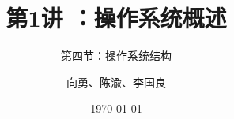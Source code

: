


\title[第1讲]{第1讲 ：操作系统概述} %
\subtitle{第四节：操作系统结构}
\author{向勇、陈渝、李国良} %
\date{\today} %



\begin{frame}
\titlepage %
\end{frame}

%
%

